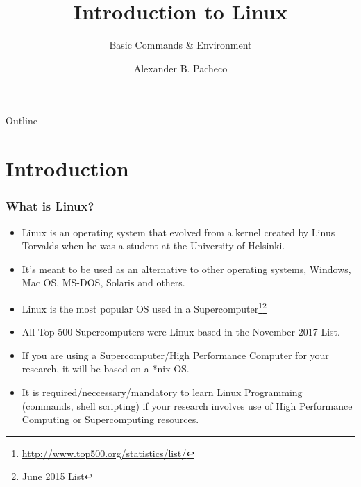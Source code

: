 \documentclass[10pt,t]{beamer}
\title{Introduction to Linux}
\subtitle{Basic Commands \& Environment}
\author{Alexander B. Pacheco}
\institute{\href{http://researchcomputing.lehigh.edu}{LTS Research Computing}}%
\date{ }
\begin{document}
\begin{frame}[c]
  \titlepage
\end{frame}

\footnotesize
\begin{frame}{Outline}
  \tableofcontents
\end{frame}

\section{Introduction}
\begin{frame}
  \frametitle{What is Linux?}
  \begin{itemize}
    \item Linux is an operating system that evolved from a kernel created by Linus Torvalds when he was a student at the University of Helsinki. 
    \item It's meant to be used as an alternative to other operating systems, Windows, Mac OS, MS-DOS, Solaris and others. 
    \item Linux is the most popular OS used in a Supercomputer\let\thefootnote\relax\footnote{\tiny \url{http://www.top500.org/statistics/list/}}\let\thefootnote\relax\footnote{\tiny June 2015 List}
      
    \item All Top 500 Supercomputers were Linux based in the November 2017 List.
    \item If you are using a Supercomputer/High Performance Computer for your research, it will be based on a *nix OS.
    \item It is required/neccessary/mandatory to learn Linux Programming (commands, shell scripting) if your research involves use of High Performance Computing or Supercomputing resources.
  \end{itemize}
\end{frame}
\end{document}
